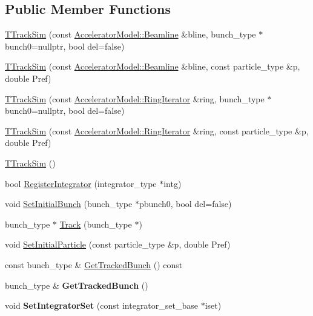 \subsection*{Public Member Functions}
\begin{DoxyCompactItemize}
\item 
\hyperlink{classTTrackSim_a753039bec4d3e2ae3cc452daf65681f7}{T\+Track\+Sim} (const \hyperlink{classAcceleratorModel_1_1Beamline}{Accelerator\+Model\+::\+Beamline} \&bline, bunch\+\_\+type $\ast$bunch0=nullptr, bool del=false)
\item 
\hyperlink{classTTrackSim_a49d104506d708be8efaa915a6d90070a}{T\+Track\+Sim} (const \hyperlink{classAcceleratorModel_1_1Beamline}{Accelerator\+Model\+::\+Beamline} \&bline, const particle\+\_\+type \&p, double Pref)
\item 
\hyperlink{classTTrackSim_a3449b7c0ac9a0bc9aa5bc462cb2096bb}{T\+Track\+Sim} (const \hyperlink{classring__iterator}{Accelerator\+Model\+::\+Ring\+Iterator} \&ring, bunch\+\_\+type $\ast$bunch0=nullptr, bool del=false)
\item 
\hyperlink{classTTrackSim_a780f5bbaf5169f555733a6fc22f85c67}{T\+Track\+Sim} (const \hyperlink{classring__iterator}{Accelerator\+Model\+::\+Ring\+Iterator} \&ring, const particle\+\_\+type \&p, double Pref)
\item 
\hyperlink{classTTrackSim_a2a1ab40b2628c61bc1da6cf41349a9a7}{T\+Track\+Sim} ()
\item 
bool \hyperlink{classTTrackSim_aace94ccc4f443e3cbb6e113b60313ee2}{Register\+Integrator} (integrator\+\_\+type $\ast$intg)
\item 
void \hyperlink{classTTrackSim_abdc1a4fd2ed79de3879b1da485768a78}{Set\+Initial\+Bunch} (bunch\+\_\+type $\ast$pbunch0, bool del=false)
\item 
bunch\+\_\+type $\ast$ \hyperlink{classTTrackSim_a6d6155f8aca0466078fddea96da97ca1}{Track} (bunch\+\_\+type $\ast$)
\item 
void \hyperlink{classTTrackSim_a3d0fad764b31429f89b7c4d909c0290b}{Set\+Initial\+Particle} (const particle\+\_\+type \&p, double Pref)
\item 
const bunch\+\_\+type \& \hyperlink{classTTrackSim_a1166829409899f10dbd9a2ce4f703277}{Get\+Tracked\+Bunch} () const
\item 
\mbox{\label{classTTrackSim_a69216bbeddea04b854bea3dada4c9eee}} 
bunch\+\_\+type \& {\bfseries Get\+Tracked\+Bunch} ()
\item 
\mbox{\label{classTTrackSim_a33c2d33e735200a7834d1c0e305d92b6}} 
void {\bfseries Set\+Integrator\+Set} (const integrator\+\_\+set\+\_\+base $\ast$iset)
\end{DoxyCompactItemize}
